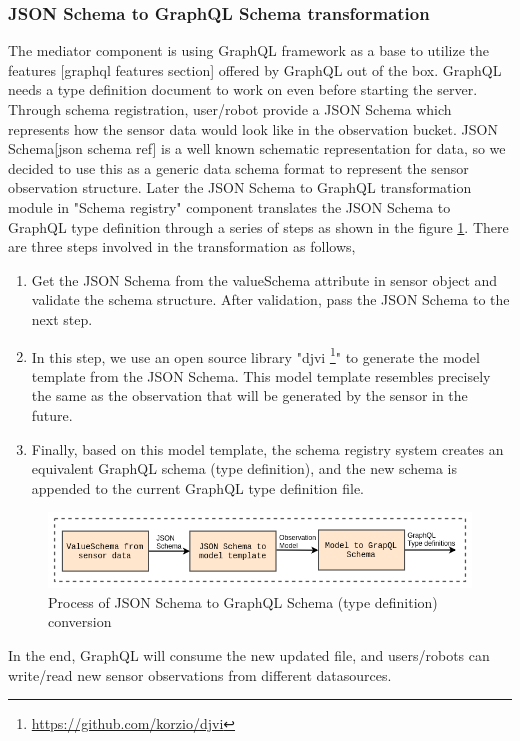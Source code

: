 	\subsubsection{JSON Schema to GraphQL Schema transformation} \label{subsubsection:jsonschema_graphqlschema}
	
	The mediator component is using GraphQL framework as a base to utilize the features [graphql features section] offered by GraphQL out of the box. GraphQL needs a type definition document to work on even before starting the server.  Through schema registration, user/robot provide a JSON Schema which represents how the sensor data would look like in the observation bucket.  JSON Schema[json schema ref] is a well known schematic representation for data, so we decided to use this as a generic data schema format to represent the sensor observation structure. Later the JSON Schema to GraphQL transformation module in "Schema registry" component translates the JSON Schema to GraphQL type definition through a series of steps as shown in the figure \ref{fig:jsonscema_to_graphql}. There are three steps involved in the transformation as follows,
	
	\begin{enumerate}
		\item Get the JSON Schema from the valueSchema attribute in sensor object and validate the schema structure. After validation, pass the JSON Schema to the next step.
		\item In this step, we use an open source library  "djvi \footnote{ \url{https://github.com/korzio/djvi}}" to generate the model template from the JSON Schema. This model template resembles precisely the same as the observation that will be generated by the sensor in the future.
		\item Finally, based on this model template, the schema registry system creates an equivalent GraphQL schema (type definition), and the new schema is appended to the current GraphQL type definition file.
	\end{enumerate}
	
	\begin{figure}[!htbp] 
		\begin{center}
			\includegraphics[scale=0.5]{./images/png/implementation/jsonscema_to_graphql}	
			\caption{Process of JSON Schema to GraphQL Schema (type definition) conversion}	
			\label{fig:jsonscema_to_graphql}	
		\end{center}
	\end{figure}

	In the end, GraphQL will consume the new updated file, and users/robots can write/read new sensor observations from different datasources.
	

